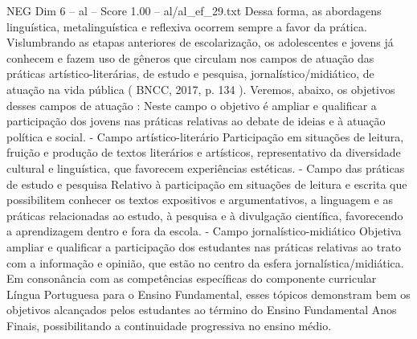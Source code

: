\begin{textsample}{NEG Dim 6 – al – Score 1.00 – al/al\_ef\_29.txt}
Dessa forma, as abordagens linguística, metalinguística e reflexiva ocorrem sempre a favor da prática.
Vislumbrando as etapas anteriores de escolarização, os adolescentes e jovens já conhecem e fazem uso de gêneros que circulam nos campos de atuação das práticas artístico-literárias, de estudo e pesquisa, jornalístico/midiático, de atuação na vida pública ( BNCC, 2017, p. 134 ).
Veremos, abaixo, os objetivos desses campos de atuação : Neste campo o objetivo é ampliar e qualificar a participação dos jovens nas práticas relativas ao debate de ideias e à atuação política e social. - Campo artístico-literário Participação em situações de leitura, fruição e produção de textos literários e artísticos, representativo da diversidade cultural e linguística, que favorecem experiências estéticas. - Campo das práticas de estudo e pesquisa Relativo à participação em situações de leitura e escrita que possibilitem conhecer os textos expositivos e argumentativos, a linguagem e as práticas relacionadas ao estudo, à pesquisa e à divulgação científica, favorecendo a aprendizagem dentro e fora da escola. - Campo jornalístico-midiático Objetiva ampliar e qualificar a participação dos estudantes nas práticas relativas ao trato com a informação e opinião, que estão no centro da esfera jornalística/midiática.
Em consonância com as competências específicas do componente curricular Língua Portuguesa para o Ensino Fundamental, esses tópicos demonstram bem os objetivos alcançados pelos estudantes ao término do Ensino Fundamental Anos Finais, possibilitando a continuidade progressiva no ensino médio.

\end{textsample}
